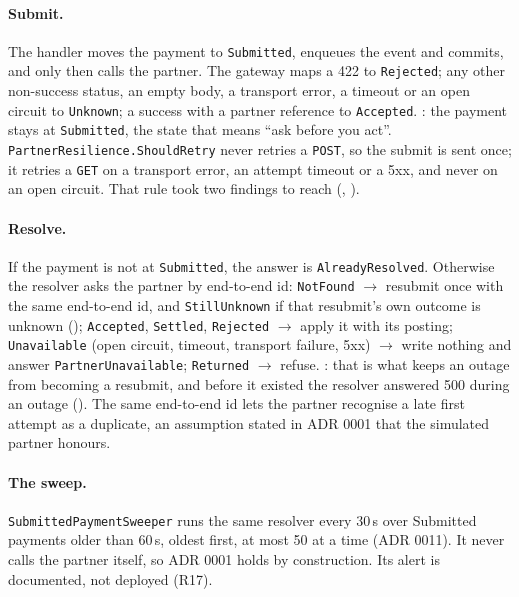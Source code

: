 \documentclass[11pt,a4paper]{article}
\begin{document}
\paragraph{Submit.} The handler moves the payment to \texttt{Submitted}, enqueues the event and
commits, and only then calls the partner. The gateway maps a 422 to \texttt{Rejected}; any other
non-success status, an empty body, a transport error, a timeout or an open circuit to
\texttt{Unknown}; a success with a partner reference to \texttt{Accepted}. : the payment stays at \texttt{Submitted}, the state that means ``ask
before you act''. \texttt{PartnerResilience.ShouldRetry} never retries a \texttt{POST}, so the
submit is sent once; it retries a \texttt{GET} on a transport error, an attempt timeout or a 5xx,
and never on an open circuit. That rule took two findings to reach (, ).

\paragraph{Resolve.} If the payment is not at \texttt{Submitted}, the answer is
\texttt{AlreadyResolved}. Otherwise the resolver asks the partner by end-to-end id:
\texttt{NotFound} $\rightarrow$ resubmit once with the same end-to-end id, and \texttt{StillUnknown}
if that resubmit's own outcome is unknown (); \texttt{Accepted}, \texttt{Settled},
\texttt{Rejected} $\rightarrow$ apply it with its posting; \texttt{Unavailable} (open circuit,
timeout, transport failure, 5xx) $\rightarrow$ write nothing and answer \texttt{PartnerUnavailable};
\texttt{Returned} $\rightarrow$ refuse. : that is
what keeps an outage from becoming a resubmit, and before it existed the resolver answered 500
during an outage (). The same end-to-end id lets the partner recognise a late first
attempt as a duplicate, an assumption stated in ADR 0001 that the simulated partner honours.

\paragraph{The sweep.} \texttt{SubmittedPaymentSweeper} runs the same resolver every 30\,s over
Submitted payments older than 60\,s, oldest first, at most 50 at a time (ADR 0011). It never calls
the partner itself, so ADR 0001 holds by construction. Its alert is documented, not deployed (R17).
\end{document}
